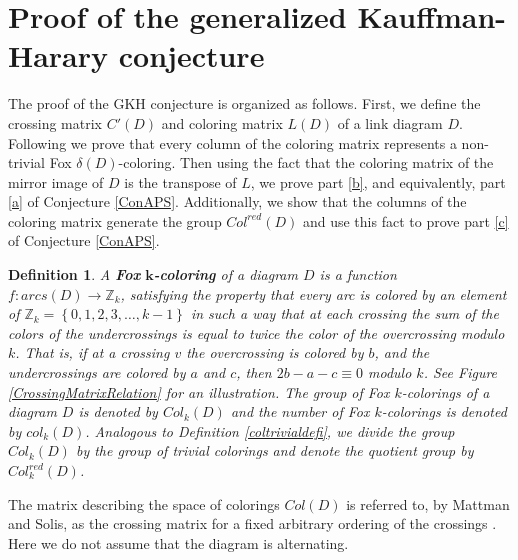 \documentclass[11pt]{amsart}
\newtheorem{definition}[theorem]{Definition}
\begin{document}
\section{Proof of the generalized Kauffman-Harary conjecture}\label{proofconjecture}

The proof of the GKH conjecture is organized as follows. First, we define the crossing matrix $C'(D)$ and coloring matrix $L(D)$ of a link diagram $D$. Following \cite{MS} we prove that every column of the coloring matrix represents a non-trivial Fox $\delta(D)$-coloring. Then using the fact that the coloring matrix of the mirror image of $D$ is the transpose of $L$, we prove part \ref{b}, and equivalently, part \ref{a} of Conjecture \ref{ConAPS}. Additionally, we show that the columns of the coloring matrix generate the group $Col^{red}(D)$ and use this fact to prove part \ref{c} of Conjecture \ref{ConAPS}. 

\begin{definition}

	A \textbf{Fox} $\boldsymbol{k}$\textbf{-coloring} of a diagram $D$ is a function $f: \mathit{arcs}(D) \to \mathbb{Z}_{k}$, satisfying the property that every arc is colored by an element of $\mathbb{Z}_{k}=\left\lbrace 0, 1, 2, 3, \dots, k-1\right\rbrace $ in such a way that at each crossing the sum of the colors of the undercrossings is equal to twice the color of the overcrossing modulo $k$. That is, if at a crossing $v$ the overcrossing is colored by $b$, and the undercrossings are colored by $a$ and $c$, then  $2b-a-c \equiv0$ modulo $k$. See Figure \ref{CrossingMatrixRelation} for an illustration. The group of Fox $k$-colorings of a diagram $D$ is denoted by $\mathit{Col}_{k}(D)$ and the number of Fox $k$-colorings is denoted by $\mathit{col}_{k}(D)$. Analogous to Definition \ref{coltrivialdefi}, we divide the group $Col_{k}(D)$ by the group of trivial colorings and denote the quotient group by $Col^{red}_{k}(D)$.
 
\end{definition}

The matrix describing the space of colorings $Col(D)$ is referred to, by Mattman and Solis, as the crossing matrix for a fixed arbitrary ordering of the crossings \cite{MS}. Here we do not assume that the diagram is alternating.
\end{document}
